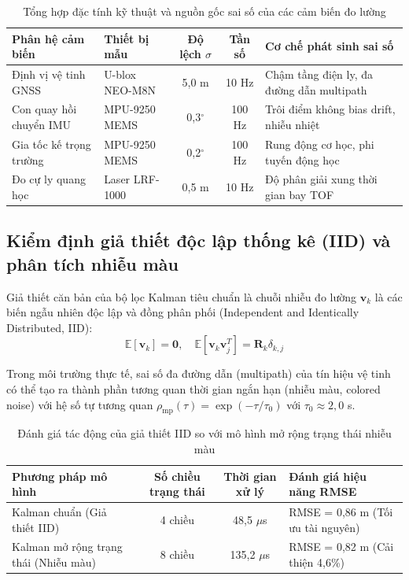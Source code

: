 \begin{table}[H]
\centering
\caption{Tổng hợp đặc tính kỹ thuật và nguồn gốc sai số của các cảm biến đo lường}
\label{tab:sensor-specs-detailed}
\begin{tabularx}{\linewidth}{llccX}
\toprule
\textbf{Phân hệ cảm biến} & \textbf{Thiết bị mẫu} & \textbf{Độ lệch $\sigma$} & \textbf{Tần số} & \textbf{Cơ chế phát sinh sai số} \\
\midrule
Định vị vệ tinh GNSS & U-blox NEO-M8N & 5{,}0 m & 10 Hz & Chậm tầng điện ly, đa đường dẫn multipath \\
Con quay hồi chuyển IMU & MPU-9250 MEMS & 0{,}3$^\circ$ & 100 Hz & Trôi điểm không bias drift, nhiễu nhiệt \\
Gia tốc kế trọng trường & MPU-9250 MEMS & 0{,}2$^\circ$ & 100 Hz & Rung động cơ học, phi tuyến động học \\
Đo cự ly quang học & Laser LRF-1000 & 0{,}5 m & 10 Hz & Độ phân giải xung thời gian bay TOF \\
\bottomrule
\end{tabularx}
\end{table}

\subsection{Kiểm định giả thiết độc lập thống kê (IID) và phân tích nhiễu màu}

\hspace{0.5cm} Giả thiết căn bản của bộ lọc Kalman tiêu chuẩn là chuỗi nhiễu đo lường $\mathbf{v}_k$ là các biến ngẫu nhiên độc lập và đồng phân phối (Independent and Identically Distributed, IID):
\begin{equation}
\mathbb{E}[\mathbf{v}_k] = \mathbf{0}, \quad \mathbb{E}[\mathbf{v}_k \mathbf{v}_j^T] = \mathbf{R}_k \delta_{k, j}
\label{eq:iid-assumption}
\end{equation}

Trong môi trường thực tế, sai số đa đường dẫn (multipath) của tín hiệu vệ tinh có thể tạo ra thành phần tương quan thời gian ngắn hạn (nhiễu màu, colored noise) với hệ số tự tương quan $\rho_{\text{mp}}(\tau) = \exp(-\tau / \tau_0)$ với $\tau_0 \approx 2{,}0$ s.

\begin{table}[H]
\centering
\caption{Đánh giá tác động của giả thiết IID so với mô hình mở rộng trạng thái nhiễu màu}
\label{tab:iid-colored-noise-comparison}
\begin{tabularx}{\linewidth}{lcc>{\RaggedRight}X}
\toprule
\textbf{Phương pháp mô hình} & \textbf{Số chiều trạng thái} & \textbf{Thời gian xử lý} & \textbf{Đánh giá hiệu năng RMSE} \\
\midrule
Kalman chuẩn (Giả thiết IID) & 4 chiều & 48{,}5 $\mu$s & RMSE = 0{,}86 m (Tối ưu tài nguyên) \\
Kalman mở rộng trạng thái (Nhiễu màu) & 8 chiều & 135{,}2 $\mu$s & RMSE = 0{,}82 m (Cải thiện 4{,}6\%) \\
\bottomrule
\end{tabularx}
\end{table}

